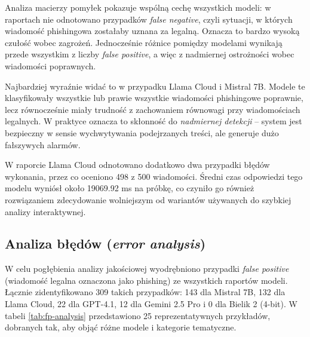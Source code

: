 \documentclass[12pt,a4paper,openright]{report}
\begin{document}
Analiza macierzy pomyłek pokazuje wspólną cechę wszystkich modeli: w raportach nie odnotowano przypadków \textit{false negative}, czyli sytuacji, w których wiadomość phishingowa zostałaby uznana za legalną. Oznacza to bardzo wysoką czułość wobec zagrożeń. Jednocześnie różnice pomiędzy modelami wynikają przede wszystkim z liczby \textit{false positive}, a więc z nadmiernej ostrożności wobec wiadomości poprawnych.

Najbardziej wyraźnie widać to w przypadku Llama Cloud i Mistral 7B. Modele te klasyfikowały wszystkie lub prawie wszystkie wiadomości phishingowe poprawnie, lecz równocześnie miały trudność z zachowaniem równowagi przy wiadomościach legalnych. W praktyce oznacza to skłonność do \textit{nadmiernej detekcji} -- system jest bezpieczny w sensie wychwytywania podejrzanych treści, ale generuje dużo fałszywych alarmów.

W raporcie Llama Cloud odnotowano dodatkowo dwa przypadki błędów wykonania, przez co oceniono 498 z 500 wiadomości. Średni czas odpowiedzi tego modelu wyniósł około 19069.92 ms na próbkę, co czyniło go również rozwiązaniem zdecydowanie wolniejszym od wariantów używanych do szybkiej analizy interaktywnej.

\subsection{Analiza błędów (\textit{error analysis})}

W celu pogłębienia analizy jakościowej wyodrębniono przypadki \textit{false positive} (wiadomość legalna oznaczona jako phishing) ze wszystkich raportów modeli. Łącznie zidentyfikowano 309 takich przypadków: 143 dla Mistral 7B, 132 dla Llama Cloud, 22 dla GPT-4.1, 12 dla Gemini 2.5 Pro i 0 dla Bielik 2 (4-bit). W tabeli \ref{tab:fp-analysis} przedstawiono 25 reprezentatywnych przykładów, dobranych tak, aby objąć różne modele i kategorie tematyczne.
\end{document}
